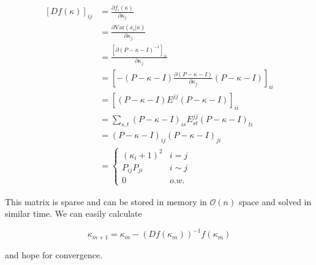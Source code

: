 \documentclass[paper=a4, fontsize=11pt]{scrartcl} %
\numberwithin{equation}{section} %
\numberwithin{figure}{section} %
\numberwithin{table}{section} %
\newcommand{\var}{\text{Var}}
\begin{document}
\begin{align*}
  [Df(\kappa)]_{ij} &= \frac{ \partial f_{i}(\kappa)}{\partial \kappa_j} \\
  &= \frac{ \partial \var( x_i |\kappa)}{\partial \kappa_j} \\
  &= \frac{ [\partial (P - \kappa - I)^{-1}]_{ii}}{\partial \kappa_j} \\
  &= [-(P-\kappa - I)\frac{ \partial (P - \kappa - I)}{\partial \kappa_j}(P- \kappa - I)]_{ii} \\
  &= [(P-\kappa - I)E^{jj}(P- \kappa - I)]_{ii} \\
  &= \sum_{s,t} (P-\kappa - I)_{is}E^{jj}_{st}(P- \kappa - I)_{ti} \\
  &= (P-\kappa - I)_{ij}(P- \kappa - I)_{ji} \\
  &=
    \begin{cases}
      (\kappa_i + 1)^2 & i = j\\
      P_{ij}P_{ji} & i \sim j \\
      0 & o.w.
    \end{cases} 
\end{align*}

This matrix is sparse and can be stored in memory in $\mathcal{O}(n)$ space and solved 
in similar time. We can easily calculate 

$$
\kappa_{m+1} = \kappa_{m} - (Df(\kappa_{m}))^{-1} f(\kappa_{m})
$$

and hope for convergence.




\end{document}
